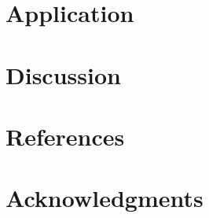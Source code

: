 \documentclass[11pt]{article}
\begin{document}
\section{Application}
\label{sec:application}

\section{Discussion}
\label{sec:discussion}

\section{References}


\section{Acknowledgments}
\end{document}
